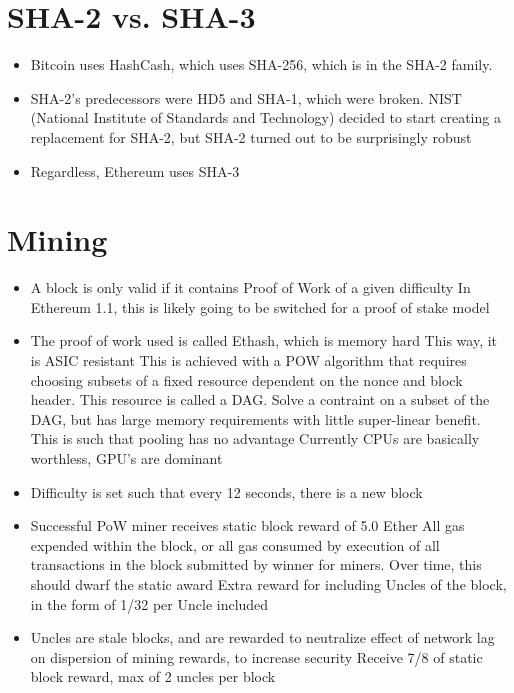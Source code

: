 \documentclass{article}
\begin{document}
\section*{SHA-2 vs. SHA-3}
\begin{itemize}
  \item Bitcoin uses HashCash, which uses SHA-256, which is in the SHA-2 family. 
  \item SHA-2's predecessors were HD5 and SHA-1, which were broken. NIST (National Institute of Standards and Technology) decided to start creating a replacement for SHA-2, 
    but SHA-2 turned out to be surprisingly robust
  \item Regardless, Ethereum uses SHA-3
\end{itemize}

\section*{Mining}
\begin{itemize}
  \item A block is only valid if it contains Proof of Work of a given difficulty
    \subitem In Ethereum 1.1, this is likely going to be switched for a proof of stake model
  \item The proof of work used is called Ethash, which is memory hard
    \subitem This way, it is ASIC resistant
    \subitem This is achieved with a POW algorithm that requires choosing subsets of a fixed resource dependent on the nonce and block header.
    \subitem This resource is called a DAG. 
    \subitem Solve a contraint on a subset of the DAG, but has large memory requirements with little super-linear benefit. This is such that pooling has no advantage
    \subitem Currently CPUs are basically worthless, GPU's are dominant
  \item Difficulty is set such that every 12 seconds, there is a new block
  \item Successful PoW miner receives 
    \subitem static block reward of 5.0 Ether
    \subitem All gas expended within the block, or all gas consumed by execution of all transactions in the block submitted by winner for miners. Over time, this should
    dwarf the static award
    \subitem Extra reward for including Uncles of the block, in the form of 1/32 per Uncle included
  \item Uncles are stale blocks, and are rewarded to neutralize effect of network lag on dispersion of mining rewards, to increase security
    \subitem Receive 7/8 of static block reward, max of 2 uncles per block
\end{itemize}
\end{document}
